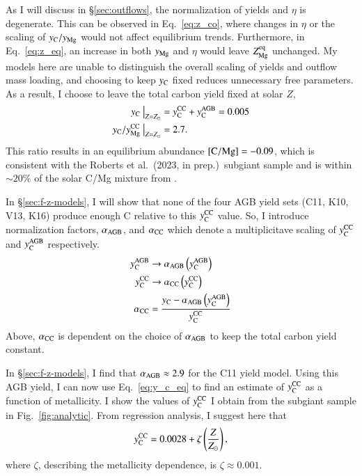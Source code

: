 \documentclass[12pt,oneside]{report}
\newcommand{\Ycc}{\ensuremath{y_{\rm C}^{\rm CC}}}
\newcommand{\Yct}{\ensuremath{y_{\rm C}}}
\newcommand{\Yoc}{\ensuremath{y_{\rm Mg}^{\rm CC}}}
\newcommand{\Ycagb}{\ensuremath{y_{\rm C}^{\rm AGB}}}
\newcommand{\citetjack}{Roberts et al.~(2023, in prep.)}
\newcommand{\about}[1]{${\sim} #1$}
\begin{document}
As I will discuss in \S\ref{sec:outflows}, the normalization of yields and $\eta$ is degenerate. This can be observed in Eq.~\ref{eq:z_co}, where changes in $\eta$ or the scaling of $y_{\rm C}/y_{\rm Mg}$ would not affect equilibrium trends. Furthermore, in Eq.~\ref{eq:z_eq}, an increase in both $y_{\rm Mg}$ and $\eta$ would leave $Z_{\rm Mg}^{\rm eq}$ unchanged. My models here are unable to distinguish the overall scaling of yields and outflow mass loading, and choosing to keep $y_{\rm C}$ fixed reduces unnecessary free parameters. 
%
As a result, I choose to leave the total carbon yield fixed at solar $Z$,
\begin{subequations}
    \begin{align}
        \Yct~\big\vert_{Z=Z_\odot} &= \Ycc + \Ycagb = 0.005 \\
        \Yct/\Yoc~\big\vert_{Z=Z_\odot} &= 2.7.
    \end{align}
\end{subequations}
This ratio results in an equilibrium abundance ${\rm [C/Mg]} = -0.09$, which is consistent with the \citetjack~subgiant sample and is within \about{20\%} of the solar C/Mg mixture from \citet{asplund+09}.

In \S\ref{sec:f-z-models}, I will show that none of the four AGB yield sets (C11, K10, V13, K16) produce enough C relative to this $\Ycc$ value. So, I introduce normalization factors, $\alpha_{\rm AGB}$, and $\alpha_{\rm CC}$ which denote a multiplicitave scaling of $\Ycc$ and $\Ycagb$ respectively. 
\begin{subequations} \label{eq:alpha}
    \begin{align}
        \Ycagb &\rightarrow \alpha_{\rm AGB} \left(\Ycagb\right) \\
        \Ycc &\rightarrow \alpha_{\rm CC} \left(\Ycc\right)\\
        \alpha_{\rm CC} &= \frac{\Yct - \alpha_{\rm AGB} \left(\Ycagb\right)}{\Ycc}
    \end{align}
\end{subequations}
Above, $\alpha_{\rm CC}$ is dependent on the choice of $\alpha_{\rm AGB}$ to keep the total carbon yield constant. 

In \S\ref{sec:f-z-models}, I find that $\alpha_{\rm AGB}\approx 2.9$ for the C11 yield model. Using this AGB yield, I can now use Eq.~\ref{eq:y_c_eq} to find an estimate of $\Ycc$ as a function of metallicity. I show the values of $\Ycc$ I obtain from the subgiant sample in Fig.~\ref{fig:analytic}. From regression analysis, I suggest here that
\begin{equation}
    \Ycc = 0.0028 + \zeta\left(\frac{Z}{Z_\odot}\right),
\end{equation}
where $\zeta$, describing the metallicity dependence, is $\zeta\approx0.001$.
\end{document}
